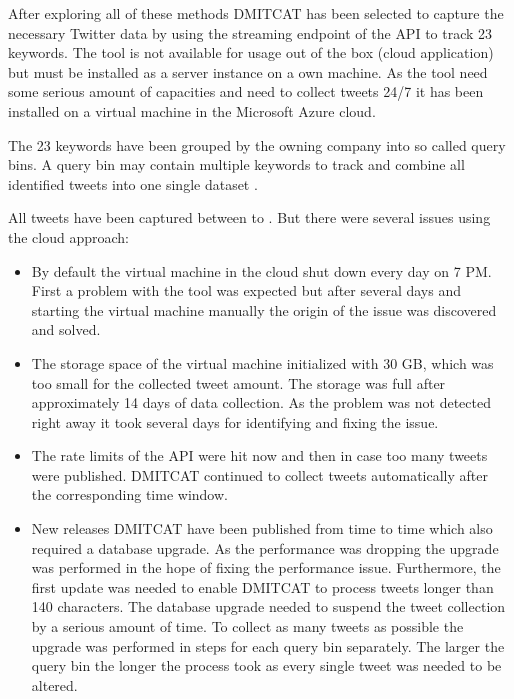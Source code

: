After exploring all of these methods \ac{DMITCAT} has been selected to capture the necessary Twitter data by using the streaming endpoint of the \ac{API} to track 23 keywords.
The tool is not available for usage out of the box (cloud application) but must be installed as a server instance on a own machine.
As the tool need some serious amount of capacities and need to collect tweets 24/7 it has been installed on a virtual machine in the Microsoft Azure cloud.

The 23 keywords have been grouped by the owning company into so called query bins.
A query bin may contain multiple keywords to track and combine all identified tweets into one single dataset \citep{Borra2014}.

All tweets have been captured between  to .
But there were several issues using the cloud approach:

\begin{itemize}

  \item By default the virtual machine in the cloud shut down every day on 7 PM.
    First a problem with the tool was expected but after several days and starting the virtual machine manually the origin of the issue was discovered and solved.

  \item The storage space of the virtual machine initialized with 30 \ac{GB}, which was too small for the collected tweet amount.
    The storage was full after approximately 14 days of data collection.
    As the problem was not detected right away it took several days for identifying and fixing the issue.

  \item The rate limits of the \ac{API} were hit now and then in case too many tweets were published.
  \ac{DMITCAT} continued to collect tweets automatically after the corresponding time window.

  \item New releases \ac{DMITCAT} have been published from time to time which also required a database upgrade.
    As the performance was dropping the upgrade was performed in the hope of fixing the performance issue.
    Furthermore, the first update was needed to enable \ac{DMITCAT} to process tweets longer than 140 characters.
    The database upgrade needed to suspend the tweet collection by a serious amount of time.
    To collect as many tweets as possible the upgrade was performed in steps for each query bin separately.
    The larger the query bin the longer the process took as every single tweet was needed to be altered.

\end{itemize}

